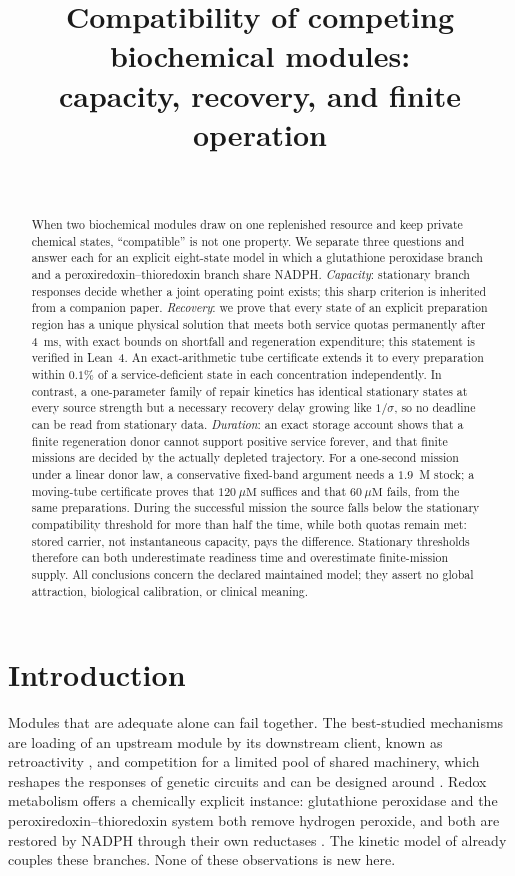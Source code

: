 \documentclass[11pt,a4paper]{article}
\title{\bfseries Compatibility of competing biochemical modules:\\
capacity, recovery, and finite operation}
\author{\PaperAuthor\\ \PaperAffiliation}
\date{\PaperDate}
\theoremstyle{plain}
\theoremstyle{definition}
\theoremstyle{remark}
\newcommand{\uM}{\ensuremath{\mu\mathrm{M}}}
\begin{document}
\maketitle

\begin{abstract}
When two biochemical modules draw on one replenished resource and keep private
chemical states, ``compatible'' is not one property. We separate three questions
and answer each for an explicit eight-state model in which a glutathione
peroxidase branch and a peroxiredoxin--thioredoxin branch share NADPH.
\emph{Capacity}: stationary branch responses decide whether a joint operating
point exists; this sharp criterion is inherited from a companion paper.
\emph{Recovery}: we prove that every state of an explicit preparation region
has a unique physical solution that meets both service quotas permanently after
$4$~ms, with exact bounds on shortfall and regeneration expenditure; this
statement is verified in Lean~4. An exact-arithmetic tube certificate extends it
to every preparation within $0.1\%$ of a service-deficient state in each
concentration independently. In contrast, a one-parameter family of repair
kinetics has identical stationary states at every source strength but a
necessary recovery delay growing like $1/\sigma$, so no deadline can be read
from stationary data. \emph{Duration}: an exact storage account shows that a
finite regeneration donor cannot support positive service forever, and that
finite missions are decided by the actually depleted trajectory. For a
one-second mission under a linear donor law, a conservative fixed-band argument
needs a $1.9$~M stock; a moving-tube certificate proves that $120~\uM$
suffices and that $60~\uM$ fails, from the same preparations. During the
successful mission the source falls below the stationary compatibility
threshold for more than half the time, while both quotas remain met:
stored carrier, not instantaneous capacity, pays the difference. Stationary
thresholds therefore can both underestimate readiness time and overestimate
finite-mission supply. All conclusions concern the declared maintained model;
they assert no global attraction, biological calibration, or clinical meaning.
\end{abstract}

\section{Introduction}\label{sec:intro}

Modules that are adequate alone can fail together. The best-studied mechanisms
are loading of an upstream module by its downstream client, known as
retroactivity \citep{delvecchio2008}, and competition for a limited pool of
shared machinery, which reshapes the responses of genetic circuits and can be
designed around \citep{gyorgy2015,qian2017,weisse2015}. Redox metabolism offers
a chemically explicit instance: glutathione peroxidase and the
peroxiredoxin--thioredoxin system both remove hydrogen peroxide, and both are
restored by NADPH through their own reductases
\citep{winterbourn2008,lu2014,stanton2012}. The kinetic model of
\citet{adimora2010} already couples these branches. None of these observations
is new here.
\end{document}
